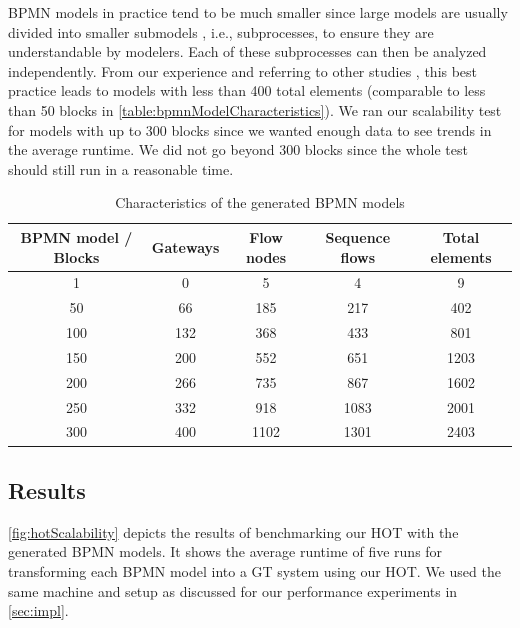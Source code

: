\documentclass{lmcs} %
\begin{document}
BPMN models in practice tend to be much smaller since large models are usually divided into smaller submodels \cite{fahlandAnalysisDemandInstantaneous2011}, i.e., subprocesses, to ensure they are understandable by modelers.
Each of these subprocesses can then be analyzed independently.
From our experience and referring to other studies \cite{fahlandAnalysisDemandInstantaneous2011}, this best practice leads to models with less than 400 total elements (comparable to less than 50 blocks in \autoref{table:bpmnModelCharacteristics}).
We ran our scalability test for models with up to 300 blocks since we wanted enough data to see trends in the average runtime.
We did not go beyond 300 blocks since the whole test should still run in a reasonable time. 


\begin{table}[ht]
\centering
\caption{Characteristics of the generated BPMN models}
\begin{tabular}{| c | c | c | c || c |}
 \hline
 BPMN model / Blocks & Gateways & Flow nodes & Sequence flows & Total elements \\
 \hline\hline
 1 & 0 & 5 & 4 & 9 \\
 \hline
 50 & 66 & 185 & 217 & 402 \\
 \hline
 100 & 132 & 368 & 433 & 801 \\
 \hline
 150 & 200 & 552 & 651 & 1203 \\
 \hline
 200 & 266 & 735 & 867 & 1602 \\
 \hline
 250 & 332 & 918 & 1083 & 2001 \\
 \hline
 300 & 400 & 1102 & 1301 & 2403 \\
 \hline
\end{tabular}
\label{table:bpmnModelCharacteristics}
\end{table}

\subsection{Results}

\autoref{fig:hotScalability} depicts the results of benchmarking our HOT with the generated BPMN models.
It shows the average runtime of five runs for transforming each BPMN model into a GT system using our HOT.
We used the same machine and setup as discussed for our performance experiments in \autoref{sec:impl}.
\end{document}

